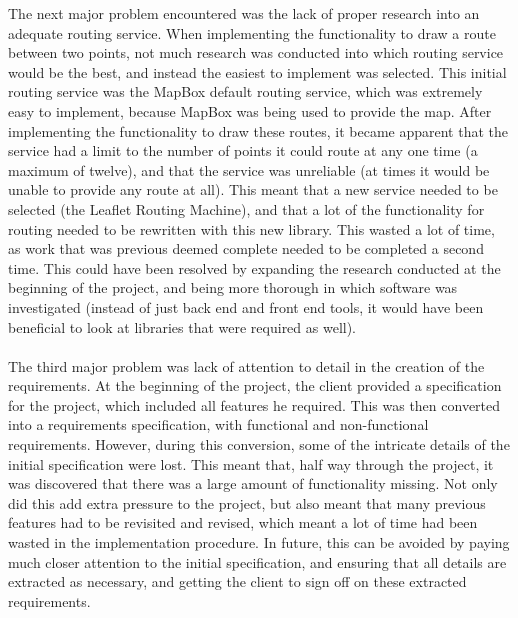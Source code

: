 The next major problem encountered was the lack of proper research into an adequate routing service. When implementing the functionality to draw a route between two points, not much research was conducted into which routing service would be the best, and instead the easiest to implement was selected. This initial routing service was the MapBox default routing service, which was extremely easy to implement, because MapBox was being used to provide the map. After implementing the functionality to draw these routes, it became apparent that the service had a limit to the number of points it could route at any one time (a maximum of twelve), and that the service was unreliable (at times it would be unable to provide any route at all). This meant that a new service needed to be selected (the Leaflet Routing Machine), and that a lot of the functionality for routing needed to be rewritten with this new library. This wasted a lot of time, as work that was previous deemed complete needed to be completed a second time. This could have been resolved by expanding the research conducted at the beginning of the project, and being more thorough in which software was investigated (instead of just back end and front end tools, it would have been beneficial to look at libraries that were required as well). \ \\
\ \\
The third major problem was lack of attention to detail in the creation of the requirements. At the beginning of the project, the client provided a specification for the project, which included all features he required. This was then converted into a requirements specification, with functional and non-functional requirements. However, during this conversion, some of the intricate details of the initial specification were lost. This meant that, half way through the project, it was discovered that there was a large amount of functionality missing. Not only did this add extra pressure to the project, but also meant that many previous features had to be revisited and revised, which meant a lot of time had been wasted in the implementation procedure. In future, this can be avoided by paying much closer attention to the initial specification, and ensuring that all details are extracted as necessary, and getting the client to sign off on these extracted requirements.



